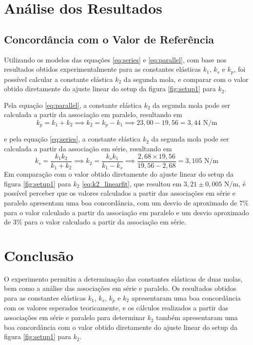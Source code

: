\documentclass[12pt,a4paper]{article}
\begin{document}
\section{Análise dos Resultados}


\subsection{Concordância com o Valor de Referência}

Utilizando os modelos das equações \eqref{eq:series} e \eqref{eq:parallel}, com base nos resultados obtidos experimentalmente para as constantes elásticas $k_1$, $k_s$ e $k_p$, foi possível calcular a constante elástica $k_2$ da segunda mola, e comparar com o valor obtido diretamente do ajuste linear do setup da figura \ref{fig:setup1} para $k_2$.

Pela equação \eqref{eq:parallel}, a constante elástica $k_2$ da segunda mola pode ser calculada a partir da associação em paralelo, resultando em
\begin{equation*}
    k_p = k_1 + k_2 \implies k_2 = k_p - k_1 \implies 23,00 - 19,56 = 3,44 \text{ N/m}
\end{equation*}

e pela equação \eqref{eq:series}, a constante elástica $k_2$ da segunda mola pode ser calculada a partir da associação em série, resultando em
\begin{equation*}
    k_s = \frac{k_1 k_2}{k_1 + k_2} \implies k_2 = \frac{k_s k_1}{k_1 - k_s} \implies \frac{2,68 \times 19,56}{19,56 - 2,68} = 3,105 \text{ N/m}
\end{equation*}
Em comparação com o valor obtido diretamente do ajuste linear do setup da figura \ref{fig:setup1} para $k_2$ \eqref{eq:k2_linearfit}, que resultou em $3,21 \pm 0,005$ N/m, é possível perceber que os valores calculados a partir das associações em série e paralelo apresentam uma boa concordância, com um desvio de aproximado de $7\%$ para o valor calculado a partir da associação em paralelo e um desvio aproximado de $3\%$ para o valor calculado a partir da associação em série.

\section{Conclusão}

O experimento permitiu a determinação das constantes elásticas de duas molas, bem como a análise das associações em série e paralelo. Os resultados obtidos para as constantes elásticas $k_1$, $k_s$, $k_p$ e $k_2$ apresentaram uma boa concordância com os valores esperados teoricamente, e os cálculos realizados a partir das associações em série e paralelo para determinar $k_2$ também apresentaram uma boa concordância com o valor obtido diretamente do ajuste linear do setup da figura \ref{fig:setup1} para $k_2$.



\end{document}
